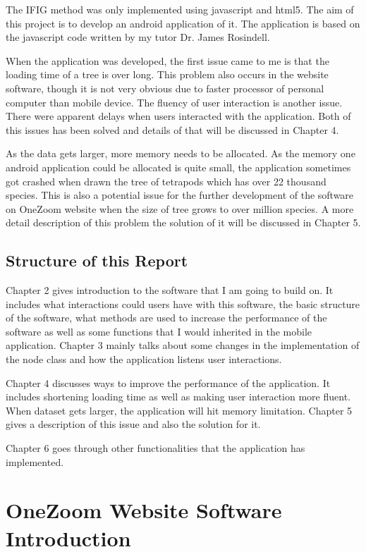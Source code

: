\documentclass[MSc]{icldt}
\begin{document}
The IFIG method was only implemented using javascript and html5. The aim of this project is to develop an android application of it. The application is based on the javascript code written by my tutor Dr. James Rosindell. 

When the application was developed, the first issue came to me is that the loading time of a tree is over long. This problem also occurs in the website software, though it is not very obvious due to faster processor of personal computer than mobile device. The fluency of user interaction is another issue. There were apparent delays when users interacted with the application. Both of this issues has been solved and details of that will be discussed in Chapter 4.

As the data gets larger, more memory needs to be allocated. As the memory one android application could be allocated is quite small, the application sometimes got crashed when drawn the tree of tetrapods which has over 22 thousand species. This is also a potential issue for the further development of the software on OneZoom website when the size of tree grows to over million species. A more detail description of this problem the solution of it will be discussed in Chapter 5.



\section{Structure of this Report}

Chapter 2 gives introduction to the software that I am going to build on. It includes what interactions could users have with this software, the basic structure of the software, what methods are used to increase the performance of the software as well as some functions that I would inherited in the mobile application. Chapter 3 mainly talks about some changes in the implementation of the node class and how the application listens user interactions. 

Chapter 4 discusses ways to improve the performance of the application. It includes shortening loading time as well as making user interaction more fluent. When dataset gets larger, the application will hit memory limitation. Chapter 5 gives a description of this issue and also the solution for it.

Chapter 6 goes through other functionalities that the application has implemented.
 

\chapter{OneZoom Website Software Introduction}
\end{document}
